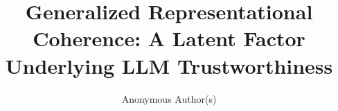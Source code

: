 \documentclass[accepted]{article}
\title{Generalized Representational Coherence: A Latent Factor Underlying LLM Trustworthiness}
\author{
  Anonymous Author(s)
}
\begin{document}
\maketitle

\begin{abstract}

\end{abstract}











\end{document}
